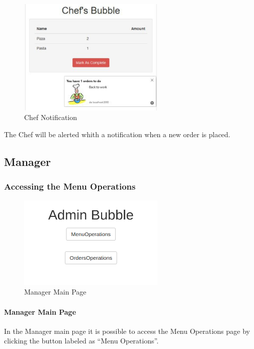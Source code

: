 \begin{figure}[H]
	\centering
	\includegraphics[width=7cm]{../../documenti/UserManualDemo/demo_screens/chef_notification.png}
	\caption{Chef Notification}
\end{figure}
The Chef will be alerted whith a notification when a new order is placed.

\subsection{Manager}
\subsubsection{Accessing the Menu Operations}
\begin{figure}[H]
	\centering
	\includegraphics[width=7cm]{../../documenti/UserManualDemo/demo_screens/admin_main.png}
	\caption{Manager Main Page}
\end{figure}
\paragraph{Manager Main Page}
In the Manager main page it is possible to access the Menu Operations page by clicking the button labeled as ``Menu Operations''.

